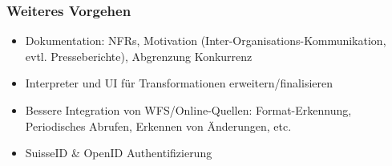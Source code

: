 \documentclass[class=scrbook,crop=false]{standalone}
\begin{document}
	\subsubsection*{Weiteres Vorgehen}
	\begin{itemize}
		\item Dokumentation: NFRs, Motivation (Inter-Organisations-Kommunikation, evtl. Presseberichte), Abgrenzung Konkurrenz
		\item Interpreter und UI für Transformationen erweitern/finalisieren
		\item Bessere Integration von WFS/Online-Quellen: Format-Erkennung, Periodisches Abrufen, Erkennen von Änderungen, etc.
		\item SuisseID \& OpenID Authentifizierung
	\end{itemize}
\end{document}
